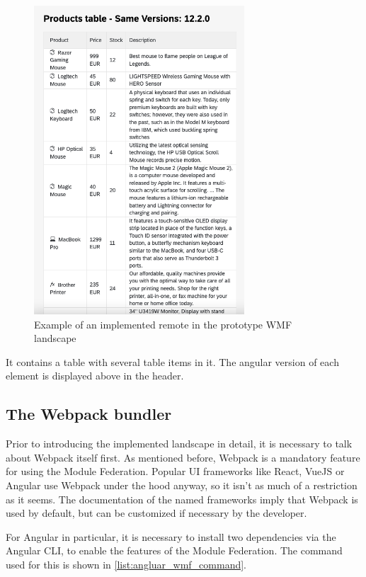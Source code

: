 \begin{figure}[!h]
	\centering
	\includegraphics[width=0.7\textwidth]{Figures/WMF_SameVersions.png}
	\caption{Example of an implemented remote in the prototype WMF landscape}
	\label{fig:wmf_screenshot}
\end{figure}

It contains a table with several table items in it. The angular version of each element is displayed above in the header.

 \subsection{The Webpack bundler}
 
Prior to introducing the implemented landscape in detail, it is necessary to talk about Webpack itself first. As mentioned before, Webpack is a mandatory feature for using the Module Federation. Popular UI frameworks like React, VueJS or Angular use Webpack under the hood anyway, so it isn't as much of a restriction as it seems.\cite{webpack_angular}\cite{webpack_react}\cite{webpack_vue}
The documentation of the named frameworks imply that Webpack is used by default, but can be customized if necessary by the developer.

For Angular in particular, it is necessary to install two dependencies via the Angular CLI, to enable the features of the Module Federation. The command used for this is shown in \ref{list:angluar_wmf_command}. 

